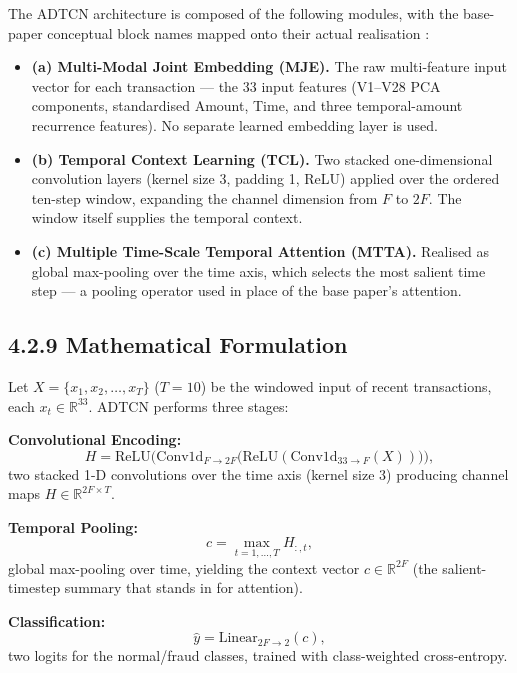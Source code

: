 The ADTCN architecture is composed of the following modules, with the base-paper conceptual block names mapped onto their actual realisation \cite{prabanand2025}:
\begin{itemize}
    \item \textbf{(a) Multi-Modal Joint Embedding (MJE).} The raw multi-feature input vector for each transaction — the 33 input features (V1--V28 PCA components, standardised Amount, Time, and three temporal-amount recurrence features). No separate learned embedding layer is used.
    \item \textbf{(b) Temporal Context Learning (TCL).} Two stacked one-dimensional convolution layers (kernel size 3, padding 1, ReLU) applied over the ordered ten-step window, expanding the channel dimension from $F$ to $2F$. The window itself supplies the temporal context.
    \item \textbf{(c) Multiple Time-Scale Temporal Attention (MTTA).} Realised as global max-pooling over the time axis, which selects the most salient time step — a pooling operator used in place of the base paper's attention.
\end{itemize}

\subsection*{4.2.9 Mathematical Formulation}

Let $X = \{x_1, x_2, \dots, x_T\}$ ($T=10$) be the windowed input of recent transactions, each $x_t \in \mathbb{R}^{33}$. ADTCN performs three stages:

\textbf{Convolutional Encoding:}
\begin{equation}\label{eq:adtcn_conv}
    H = \mathrm{ReLU}\big(\mathrm{Conv1d}_{F\to 2F}\big(\mathrm{ReLU}(\mathrm{Conv1d}_{33\to F}(X))\big)\big),
\end{equation}
two stacked 1-D convolutions over the time axis (kernel size 3) producing channel maps $H \in \mathbb{R}^{2F\times T}$.

\textbf{Temporal Pooling:}
\begin{equation}\label{eq:adtcn_pool}
    c = \max_{t=1,\dots,T} H_{:,t},
\end{equation}
global max-pooling over time, yielding the context vector $c \in \mathbb{R}^{2F}$ (the salient-timestep summary that stands in for attention).

\textbf{Classification:}
\begin{equation}\label{eq:adtcn_cls}
    \hat{y} = \mathrm{Linear}_{2F\to 2}(c),
\end{equation}
two logits for the normal/fraud classes, trained with class-weighted cross-entropy.

